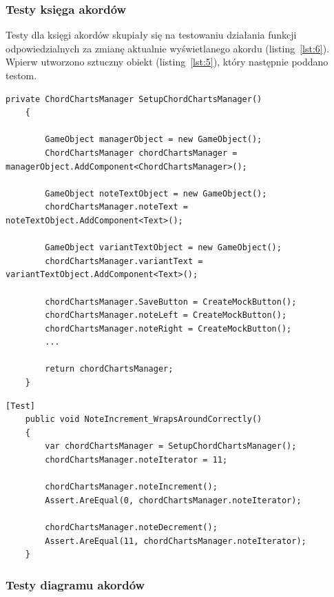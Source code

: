 \subsubsection{Testy księga akordów}

Testy dla księgi akordów skupiały się na testowaniu działania funkcji odpowiedzialnych za zmianę aktualnie wyświetlanego akordu (listing~\ref{lst:6}). Wpierw utworzono sztuczny obiekt (listing~\ref{lst:5}), który następnie poddano testom.

\begin{lstlisting}[style=sharpcstyle,caption=Funkcja \texttt{SetupChordChartsManager}, label=lst:5]
    private ChordChartsManager SetupChordChartsManager()
    {

        GameObject managerObject = new GameObject();
        ChordChartsManager chordChartsManager = managerObject.AddComponent<ChordChartsManager>();

        GameObject noteTextObject = new GameObject();
        chordChartsManager.noteText = noteTextObject.AddComponent<Text>();

        GameObject variantTextObject = new GameObject();
        chordChartsManager.variantText = variantTextObject.AddComponent<Text>();

        chordChartsManager.SaveButton = CreateMockButton();
        chordChartsManager.noteLeft = CreateMockButton();
        chordChartsManager.noteRight = CreateMockButton();
        ...

        return chordChartsManager;
    }
\end{lstlisting}


\begin{lstlisting}[style=sharpcstyle,caption=Funkcja \texttt{NoteIncrement\_WrapsAroundCorrectly}, label=lst:6]
    [Test]
    public void NoteIncrement_WrapsAroundCorrectly()
    {
        var chordChartsManager = SetupChordChartsManager();
        chordChartsManager.noteIterator = 11;

        chordChartsManager.noteIncrement();
        Assert.AreEqual(0, chordChartsManager.noteIterator);

        chordChartsManager.noteDecrement();
        Assert.AreEqual(11, chordChartsManager.noteIterator);
    }
\end{lstlisting}

\subsubsection{Testy diagramu akordów}

